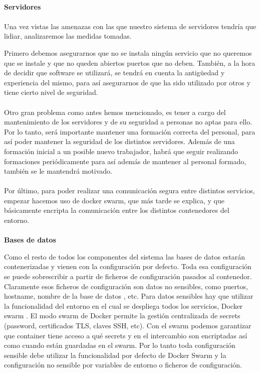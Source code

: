 \paragraph{}
\textbf{Servidores}
\paragraph{}
Una vez vistas las amenazas con las que nuestro sistema de servidores
tendría que lidiar, analizaremos las medidas tomadas.

Primero debemos asegurarnos que no se instala ningún servicio que no
queremos que se instale y que no queden abiertos puertos que no
deben. También, a la hora de decidir que software se utilizará, se
tendrá en cuenta la antigüedad y experiencia del mismo, para así
asegurarnos de que ha sido utilizado por otros y tiene cierto nivel de
seguridad.
\paragraph{}
Otro gran problema como antes hemos mencionado, es tener a cargo del
mantenimiento de los servidores y de su seguridad a personas no aptas
para ello. Por lo tanto, será importante mantener una formación
correcta del personal, para así poder mantener la seguridad de los
distintos servidores. Además de una formación inicial a un posible
nuevo trabajador, habrá que seguir realizando formaciones
periódicamente para así además de mantener al personal formado,
también se le mantendrá motivado.
\paragraph{}
Por último, para poder realizar una comunicación segura entre
distintos servicios, empezar hacemos uso de docker swarm, que más
tarde se explica, y que básicamente encripta la comunicación entre los
distintos contenedores del entorno.
\paragraph{}
\textbf{Bases de datos}

Como el resto de todos los componentes del sistema las bases de datos
estarán contenerizadas y vienen con la configuración por defecto. Toda
esa configuración se puede sobrescribir a partir de ficheros de
configuración pasados al contenedor. Claramente esos ficheros de
configuración son datos no sensibles, como puertos, hostname, nombre
de la base de datos , etc. Para datos sensibles hay que utilizar la
funcionalidad del entorno en el cual se despliega todos los servicios,
Docker swarm \cite{dockerSwarmDocs}. El modo swarm de Docker permite la gestión centralizada
de secrets \cite{dockerSwarmSecretsDocs}(password, certificados TLS, claves SSH, etc). Con el swarm
podemos garantizar que container tiene acceso a qué secrets y en el
intercambio son encriptadas así como cuando están guardadas en el
swarm. Por lo tanto toda configuración sensible debe utilizar la
funcionalidad por defecto de Docker Swarm y la configuración no
sensible por variables de entorno o ficheros de configuración.

